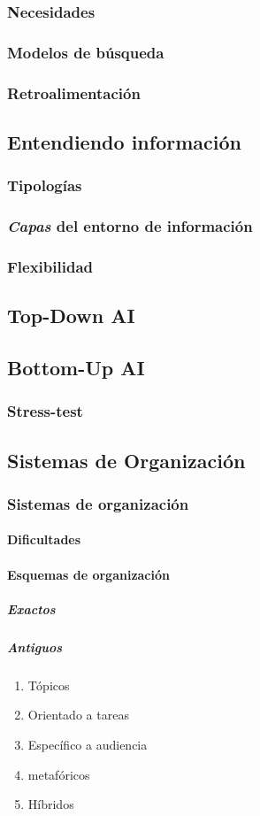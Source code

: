 \documentclass[12pt]{report}
\begin{document}
			\subsubsection{Necesidades}
			\subsubsection{Modelos de búsqueda}
			\subsubsection{Retroalimentación}
		\subsection{Entendiendo información}
			\subsubsection{Tipologías}
			\subsubsection{\textit{Capas} del entorno de información}
			\subsubsection{Flexibilidad}
		\subsection{Top-Down AI}
		\subsection{Bottom-Up AI}
			\subsubsection{Stress-test}
		\subsection{Sistemas de Organización}
			\subsubsection{Sistemas de organización}
				\paragraph{Dificultades}
				\paragraph{Esquemas de organización}
					\subparagraph{Exactos}
					\subparagraph{Antiguos}
						\begin{enumerate}
							\item Tópicos
							\item Orientado a tareas
							\item Específico a audiencia
							\item metafóricos
							\item Híbridos
						\end{enumerate}
\end{document}
